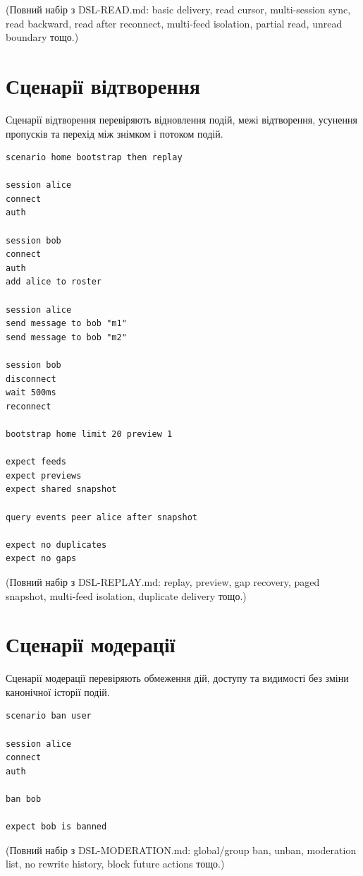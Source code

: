 \documentclass{article}
\begin{document}
(Повний набір з DSL-READ.md: basic delivery, read cursor, multi-session sync, read backward, read after reconnect, multi-feed isolation, partial read, unread boundary тощо.)

\section{Сценарії відтворення}

Сценарії відтворення перевіряють відновлення подій, межі відтворення, усунення пропусків та перехід між знімком і потоком подій.

\begin{lstlisting}[language={},basicstyle=\ttfamily\small]
scenario home bootstrap then replay

session alice
connect
auth

session bob
connect
auth
add alice to roster

session alice
send message to bob "m1"
send message to bob "m2"

session bob
disconnect
wait 500ms
reconnect

bootstrap home limit 20 preview 1

expect feeds
expect previews
expect shared snapshot

query events peer alice after snapshot

expect no duplicates
expect no gaps
\end{lstlisting}

(Повний набір з DSL-REPLAY.md: replay, preview, gap recovery, paged snapshot, multi-feed isolation, duplicate delivery тощо.)

\section{Сценарії модерації}

Сценарії модерації перевіряють обмеження дій, доступу та видимості без зміни канонічної історії подій.

\begin{lstlisting}[language={},basicstyle=\ttfamily\small]
scenario ban user

session alice
connect
auth

ban bob

expect bob is banned
\end{lstlisting}

(Повний набір з DSL-MODERATION.md: global/group ban, unban, moderation list, no rewrite history, block future actions тощо.)
\end{document}
